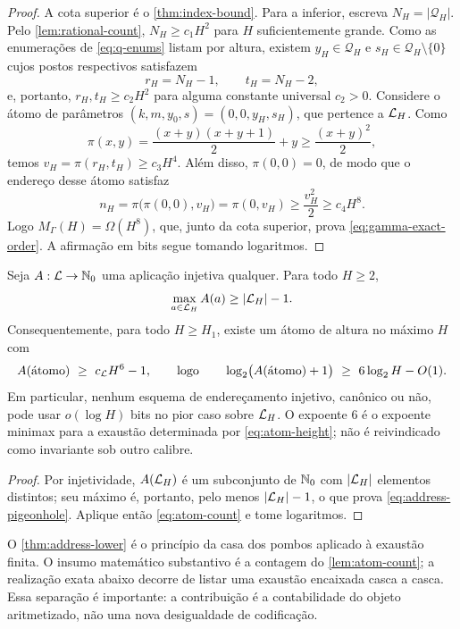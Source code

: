 \begin{proof}
A cota superior é o \cref{thm:index-bound}. Para a inferior, escreva
$N_H=|\mathcal Q_H|$. Pelo \cref{lem:rational-count}, $N_H\ge c_1H^2$ para
$H$ suficientemente grande. Como as enumerações de \eqref{eq:q-enums} listam
por altura, existem $y_H\in\mathcal Q_H$ e
$s_H\in\mathcal Q_H\setminus\{0\}$ cujos postos respectivos satisfazem
\[
 r_H=N_H-1,\qquad t_H=N_H-2,
\]
e, portanto, $r_H,t_H\ge c_2H^2$ para alguma constante universal $c_2>0$.
Considere o átomo de parâmetros $(k,m,y_0,s)=(0,0,y_H,s_H)$, que pertence a
$\mathcal{L}_H$. Como
\[
 \pi(x,y)=\frac{(x+y)(x+y+1)}2+y\ge\frac{(x+y)^2}{2},
\]
temos $v_H=\pi(r_H,t_H)\ge c_3H^4$. Além disso,
$\pi(0,0)=0$, de modo que o endereço desse átomo satisfaz
\[
 n_H=\pi\bigl(\pi(0,0),v_H\bigr)=\pi(0,v_H)
 \ge\frac{v_H^2}{2}\ge c_4H^8.
\]
Logo $M_\Gamma(H)=\Omega(H^8)$, que, junto da cota superior, prova
\eqref{eq:gamma-exact-order}. A afirmação em bits segue tomando logaritmos.
\end{proof}

\begin{theorem}\label{thm:address-lower}
Seja $A:\mathcal{L}\to\mathbb{N}_0$ uma aplicação injetiva qualquer. Para todo $H\ge2$,
\begin{equation}
 \max_{a\in\mathcal{L}_H}A(a)\ge |\mathcal{L}_H|-1.
 \label{eq:address-pigeonhole}
\end{equation}
Consequentemente, para todo $H\ge H_1$, existe um átomo de altura no máximo
$H$ com
\begin{equation}
 A(\text{átomo})\ \ge\ c_{\mathcal{L}} H^6-1,
 \qquad\text{logo}\qquad
 \log_2\bigl(A(\text{átomo})+1\bigr)\ \ge\ 6\log_2H-O(1).
 \label{eq:address-lower}
\end{equation}
Em particular, nenhum esquema de endereçamento injetivo, canônico ou não,
pode usar $o(\log H)$ bits no pior caso sobre $\mathcal{L}_H$. O expoente $6$ é
o expoente minimax para a exaustão determinada por \eqref{eq:atom-height}; não
é reivindicado como invariante sob outro calibre.
\end{theorem}

\begin{proof}
Por injetividade, $A(\mathcal{L}_H)$ é um subconjunto de $\mathbb{N}_0$ com
$|\mathcal{L}_H|$ elementos distintos; seu máximo é, portanto, pelo menos
$|\mathcal{L}_H|-1$, o que prova \eqref{eq:address-pigeonhole}. Aplique então
\eqref{eq:atom-count} e tome logaritmos.
\end{proof}

O \cref{thm:address-lower} é o princípio da casa dos pombos aplicado à
exaustão finita. O insumo matemático substantivo é a contagem do
\cref{lem:atom-count}; a realização exata abaixo decorre de listar uma
exaustão encaixada casca a casca. Essa separação é importante: a contribuição
é a contabilidade do objeto aritmetizado, não uma nova desigualdade de
codificação.


